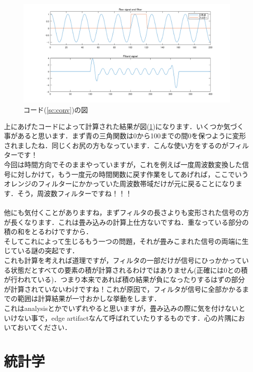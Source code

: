 \documentclass[11pt,a4paper]{jreport}
\begin{document}
\begin{figure}[H]
\label{im:conv2}
  \centering
  \includegraphics[width=300mm,bb=0 0 1400 400]{../figures/conv.png}
  \caption{コード(\ref{sc:conv})の図}
\end{figure}

上にあげたコードによって計算された結果が図(\ref{im:conv2})になります．いくつか気づく事があると思います．まず青の三角関数は0から100までの間0を保つように変形されましたね．同じくお尻の方もなっています．こんな使い方をするのがフィルターです！\\
今回は時間方向でそのままやっていますが，これを例えば一度周波数変換した信号に対しかけて，もう一度元の時間関数に戻す作業をしてあげれば，ここでいうオレンジのフィルターにかかっていた周波数帯域だけが元に戻ることになります．そう，周波数フィルターですね！！！\\
\\
他にも気付くことがありますね，まずフィルタの長さよりも変形された信号の方が長くなります．これは畳み込みの計算上仕方ないですね．重なっている部分の積の和をとるわけですから．\\
そしてこれによって生じるもう一つの問題，それが畳みこまれた信号の両端に生じている謎の突起です．\\
これも計算を考えれば道理ですが，フィルタの一部だけが信号にひっかかっている状態だとすべての要素の積が計算されるわけではありません(正確には0との積が行われている)．つまり本来であれば積の結果が負になったりするはずの部分が計算されていないわけですね！これが原因で，フィルタが信号に全部かかるまでの範囲は計算結果が一寸おかしな挙動をします．\\
これはanalysisとかでいずれやると思いますが，畳み込みの際に気を付けないといけない事で，edge artifactなんて呼ばれていたりするものです．心の片隅においておいてください．


\chapter{統計学}
\end{document}
